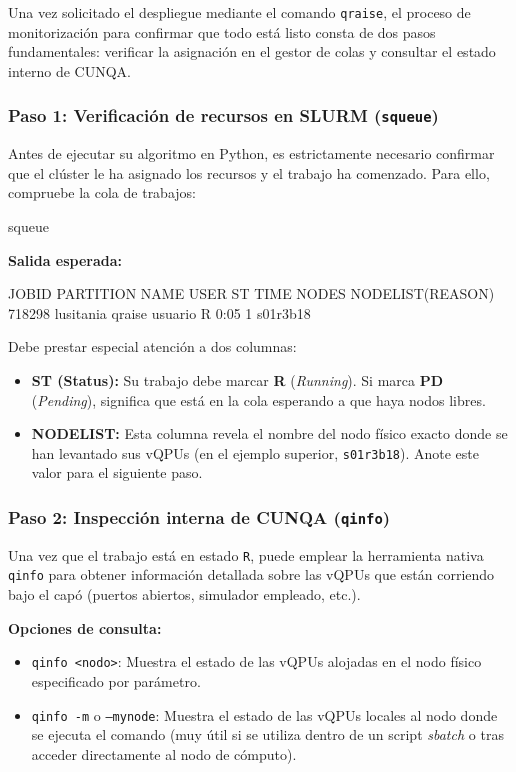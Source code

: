\documentclass[a4paper,11pt]{article}
\begin{document}
Una vez solicitado el despliegue mediante el comando \texttt{qraise}, el proceso de monitorización para confirmar que todo está listo consta de dos pasos fundamentales: verificar la asignación en el gestor de colas y consultar el estado interno de CUNQA.

\subsubsection{Paso 1: Verificación de recursos en SLURM (\texttt{squeue})}
Antes de ejecutar su algoritmo en Python, es estrictamente necesario confirmar que el clúster le ha asignado los recursos y el trabajo ha comenzado. Para ello, compruebe la cola de trabajos:

\begin{terminal}
squeue
\end{terminal}

\textbf{Salida esperada:}
\begin{terminal}[listing options={columns=fixed, basicstyle=\color{gray!80}\ttfamily\small, literate={}}]
JOBID   PARTITION  NAME    USER      ST  TIME  NODES NODELIST(REASON)
718298  lusitania  qraise  usuario   R   0:05  1     s01r3b18
\end{terminal}

\vspace{0.3cm}
Debe prestar especial atención a dos columnas:
\begin{itemize}
    \item \textbf{ST (Status):} Su trabajo debe marcar \textbf{R} (\textit{Running}). Si marca \textbf{PD} (\textit{Pending}), significa que está en la cola esperando a que haya nodos libres.
    \item \textbf{NODELIST:} Esta columna revela el nombre del nodo físico exacto donde se han levantado sus vQPUs (en el ejemplo superior, \texttt{s01r3b18}). Anote este valor para el siguiente paso.
\end{itemize}

\subsubsection{Paso 2: Inspección interna de CUNQA (\texttt{qinfo})}
Una vez que el trabajo está en estado \texttt{R}, puede emplear la herramienta nativa \texttt{qinfo} para obtener información detallada sobre las vQPUs que están corriendo bajo el capó (puertos abiertos, simulador empleado, etc.).

\textbf{Opciones de consulta:}
\begin{itemize}
    \item \texttt{qinfo <nodo>}: Muestra el estado de las vQPUs alojadas en el nodo físico especificado por parámetro.
    \item \texttt{qinfo -m} o \texttt{--mynode}: Muestra el estado de las vQPUs locales al nodo donde se ejecuta el comando (muy útil si se utiliza dentro de un script \textit{sbatch} o tras acceder directamente al nodo de cómputo).
\end{itemize}
\end{document}
